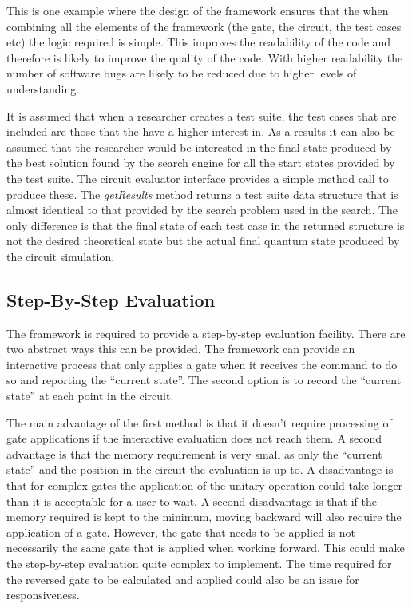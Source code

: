 This is one example where the design of the framework ensures that the when combining all the elements of the framework (the gate, the circuit, the test cases etc) the logic required is simple.
This improves the readability of the code and therefore is likely to improve the quality of the code.
With higher readability the number of software bugs are likely to be reduced due to higher levels of understanding.

It is assumed that when a researcher creates a test suite, the test cases that are included are those that the have a higher interest in.
As a results it can also be assumed that the researcher would be interested in the final state produced by the best solution found by the search engine for all the start states provided by the test suite.
The circuit evaluator interface provides a simple method call to produce these.
The \emph{getResults} method returns a test suite data structure that is almost identical to that provided by the search problem used in the search.
The only difference is that the final state of each test case in the returned structure is not the desired theoretical state but the actual final quantum state produced by the circuit simulation.

\subsection{Step-By-Step Evaluation}
\label{sec:sbsecireval}
The framework is required to provide a step-by-step evaluation facility.
There are two abstract ways this can be provided.
The framework can provide an interactive process that only applies a gate when it receives the command to do so and reporting the ``current state''.
The second option is to record the ``current state'' at each point in the circuit.

The main advantage of the first method is that it doesn't require processing of gate applications if the interactive evaluation does not reach them.
A second advantage is that the memory requirement is very small as only the ``current state'' and the position in the circuit the evaluation is up to.
A disadvantage is that for complex gates the application of the unitary operation could take longer than it is acceptable for a user to wait.
A second disadvantage is that if the memory required is kept to the minimum, moving backward will also require the application of a gate.
However, the gate that needs to be applied is not necessarily the same gate that is applied when working forward.
This could make the step-by-step evaluation quite complex to implement.
The time required for the reversed gate to be calculated and applied could also be an issue for responsiveness.

